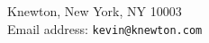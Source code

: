 



\par \nobreak \begingroup
\footnotesize
\noindent
Knewton, New York, NY 10003\\
Email address: {\tt kevin@knewton.com}


